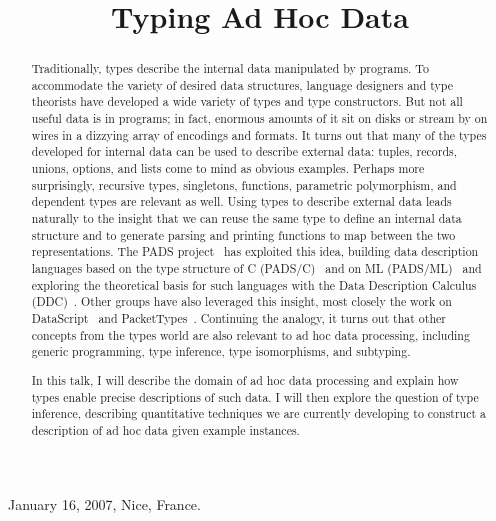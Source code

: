 \documentclass{sigplanconf}
\begin{document}
\authorpermission
{} {January 16, 2007, Nice, France.}

\title{Typing Ad Hoc Data}



\maketitle{}
\begin{abstract}
Traditionally, types describe the internal data manipulated by
programs.  To accommodate the variety of desired data structures,
language designers and type theorists have developed a wide variety of
types and type constructors.  But not all useful data is in programs;
in fact, enormous amounts of it sit on disks or stream by on wires in
a dizzying array of encodings and formats.  It turns out that many of
the types developed for internal data can be used to describe external
data: tuples, records, unions, options, and lists come to mind as
obvious examples.  Perhaps more surprisingly, recursive types,
singletons, functions, parametric polymorphism, and dependent types
are relevant as well.  Using types to describe external data leads
naturally to the insight that we can reuse the same type to define an
internal data structure and to generate parsing and printing functions
to map between the two representations.  The PADS
project~\cite{padsproject} has exploited this idea, building data
description languages based on the type structure of C
(PADS/C)~\cite{fisher+:pads} and on ML
(PADS/ML)~\cite{mandelbaum+:pads-ml} and exploring the theoretical
basis for such languages with the Data Description Calculus
(DDC)~\cite{fisher+:next700ddl}.
Other groups have also leveraged this
insight, most closely the work on DataScript~\cite{gpce02} and
PacketTypes~\cite{sigcomm00}. 
Continuing the analogy, it turns out that other concepts from the
types world are also relevant to ad hoc data processing, including
generic programming, type inference, type isomorphisms, and subtyping.

In this talk, I will describe the domain of ad hoc data processing and
explain how types enable precise descriptions of such data.  I will
then explore the question of type inference, describing quantitative
techniques we are currently developing to construct a description of
ad hoc data given example instances.


\end{abstract}
\end{document}
